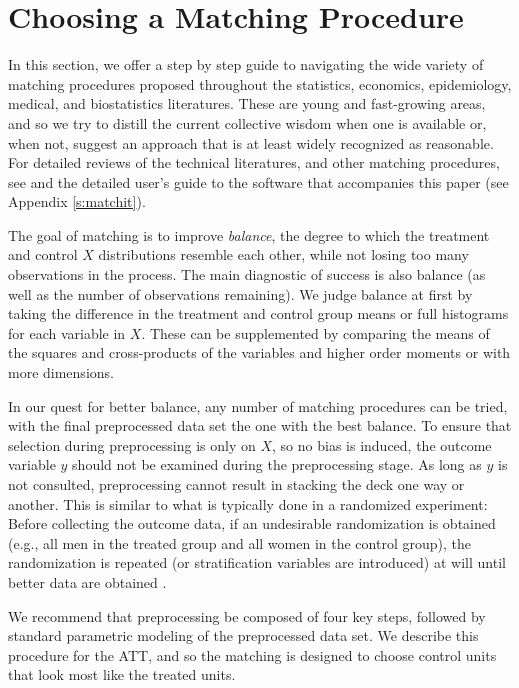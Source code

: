 \documentclass[11pt,titlepage]{article}
\begin{document}
\section{Choosing a Matching Procedure}\label{s:choose}

In this section, we offer a step by step guide to navigating the wide
variety of matching procedures proposed throughout the statistics,
economics, epidemiology, medical, and biostatistics literatures.
These are young and fast-growing areas, and so we try to distill the
current collective wisdom when one is available or, when not, suggest
an approach that is at least widely recognized as reasonable.  For
detailed reviews of the technical literatures, and other matching
procedures, see \citet{Imbens04,Rosenbaum02,Stuart04} and the detailed
user's guide to the software that accompanies this paper (see Appendix
\ref{s:matchit}).

The goal of matching is to improve \emph{balance}, the degree to which
the treatment and control $X$ distributions resemble each other, while
not losing too many observations in the process.  The main diagnostic
of success is also balance (as well as the number of observations
remaining).  We judge balance at first by taking the difference in the
treatment and control group means or full histograms for each variable
in $X$.  These can be supplemented by comparing the means of the
squares and cross-products of the variables and higher order moments
or with more dimensions.

In our quest for better balance, any number of matching procedures can
be tried, with the final preprocessed data set the one with the best
balance.  To ensure that selection during preprocessing is only on
$X$, so no bias is induced, the outcome variable $y$ should not be
examined during the preprocessing stage.  As long as $y$ is not
consulted, preprocessing cannot result in stacking the deck one way or
another.  This is similar to what is typically done in a randomized
experiment: Before collecting the outcome data, if an undesirable
randomization is obtained (e.g., all men in the treated group and all
women in the control group), the randomization is repeated (or
stratification variables are introduced) at will until better data are
obtained \citep[see][]{Rubin01}.

We recommend that preprocessing be composed of four key steps,
followed by standard parametric modeling of the preprocessed data set.
We describe this procedure for the ATT, and so the matching is
designed to choose control units that look most like the treated
units.
\end{document}
